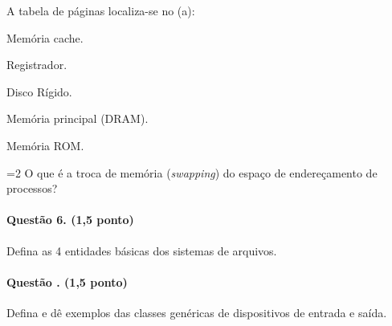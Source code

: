 {\question[0,5] A tabela de p\'aginas localiza-se no (a):

\begin{enumerate}[(a)]
{\item Mem\'oria cache.}
{\item Registrador.}
{\item Disco Rígido.}
{\item Mem\'oria principal (DRAM).}
{\item Mem\'oria ROM.}
\end{enumerate}

}

=2
O que \'e a troca de mem\'oria ({\em swapping}) do espa\c{c}o de endere\c{c}amento de
processos?


\paragraph{Quest\~ao 6. (1,5 ponto)}
Defina as 4 entidades b\'asicas dos sistemas de
arquivos.

\paragraph{Quest\~ao \ex{}. (1,5 ponto)}
Defina e d\^e exemplos das classes gen\'ericas de dispositivos de entrada
e sa\'ida.

\fi